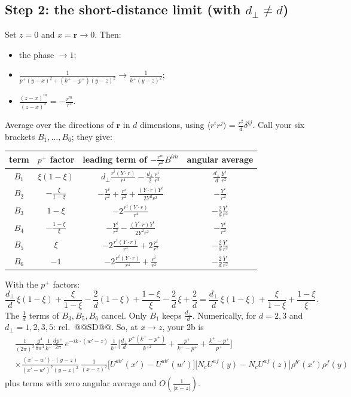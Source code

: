\documentclass[10pt]{article}
\numberwithin{equation}{section}
\begin{document}
\subsection*{Step 2: the short-distance limit (with \texorpdfstring{$d_\perp\neq d$}{d_perp not equal to d})}
Set $z=0$ and $x=\mathbf r\to0$. Then:
\begin{itemize}
\item the phase $\to1$;
\item $\frac{1}{p^+(y-x)^2+(k^+-p^+)(y-z)^2}\to\frac{1}{k^+(y-z)^2}$;
\item $\frac{(z-x)^m}{(z-x)^2}=-\frac{r^m}{r^2}$.
\end{itemize}
Average over the directions of $\mathbf r$ in $d$ dimensions, using $\langle r^ir^j\rangle=\frac{r^2}{d}\delta^{ij}$. Call your six brackets $B_1,\dots,B_6$; they give:
\begin{center}\small
\begin{tabular}{@{}cccc@{}}\toprule
term & $p^+$ factor & leading term of $-\frac{r^m}{r^2}B^{im}$ & angular average\\\midrule
$B_1$ & $\xi(1-\xi)$ & $d_\perp\frac{r^i(Y\cdot r)}{r^4}-\frac{d_\perp}{2}\frac{r^i}{r^2}$ & $\frac{d_\perp}{d}\frac{Y^i}{r^2}$\\
$B_2$ & $-\frac{\xi}{1-\xi}$ & $-\frac{Y^i}{r^2}+\frac{r^i}{r^2}+\frac{(Y\cdot r)Y^i}{2Y^2r^2}$ & $-\frac{Y^i}{r^2}$\\
$B_3$ & $1-\xi$ & $-2\frac{r^i(Y\cdot r)}{r^4}$ & $-\frac2d\frac{Y^i}{r^2}$\\
$B_4$ & $-\frac{1-\xi}{\xi}$ & $-\frac{Y^i}{r^2}-\frac{(Y\cdot r)Y^i}{2Y^2r^2}$ & $-\frac{Y^i}{r^2}$\\
$B_5$ & $\xi$ & $-2\frac{r^i(Y\cdot r)}{r^4}+2\frac{r^i}{r^2}$ & $-\frac2d\frac{Y^i}{r^2}$\\
$B_6$ & $-1$ & $-2\frac{r^i(Y\cdot r)}{r^4}+\frac{r^i}{r^2}$ & $-\frac2d\frac{Y^i}{r^2}$\\\bottomrule
\end{tabular}
\end{center}
With the $p^+$ factors:
\begin{equation}
\frac{d_\perp}{d}\,\xi(1-\xi)+\frac{\xi}{1-\xi}-\frac{2}{d}(1-\xi)+\frac{1-\xi}{\xi}-\frac2d\,\xi+\frac2d=\frac{d_\perp}{d}\,\xi(1-\xi)+\frac{\xi}{1-\xi}+\frac{1-\xi}{\xi}.
\label{eq:coef}
\end{equation}
The $\frac1d$ terms of $B_3,B_5,B_6$ cancel. Only $B_1$ keeps $\frac{d_\perp}{d}$. Numerically, for $d=2,3$ and $d_\perp=1,2,3,5$: rel.\ @@SD@@. So, at $x\to z$, your 2b is
\begin{align*}
&\frac{1}{(2\pi)^{3}}\frac{g^{4}}{8\pi^{4}}\frac{1}{k^{+}}\frac{dp^+}{2\pi}\,e^{-ik\cdot(w'-z)}\,\frac{1}{k^{+}}\Big[\frac{d_\perp}{d}\frac{p^{+}(k^{+}-p^{+})}{k^{+2}}+\frac{p^{+}}{k^{+}-p^{+}}+\frac{k^{+}-p^{+}}{p^{+}}\Big]\\
&\times\frac{(x'-w')\cdot(y-z)}{(x'-w')^{2}(y-z)^{2}}\,\frac{1}{(x-z)^{2}}\Big[U^{ab'}(x')-U^{ab'}(w')\Big]\Big[N_cU^{af}(y)-N_cU^{af}(z)\Big]\rho^{b'}(x')\rho^{f}(y)
\end{align*}
plus terms with zero angular average and $O(\frac1{|x-z|})$.
\end{document}

